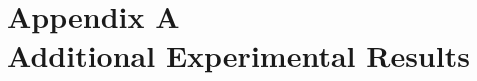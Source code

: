 \documentclass[lettersize,journal]{IEEEtran}
\begin{document}




\section*{Appendix A \\ Additional Experimental Results}
\renewcommand{\thetable}{A\arabic{table}}
\setcounter{table}{0}
\end{document}
